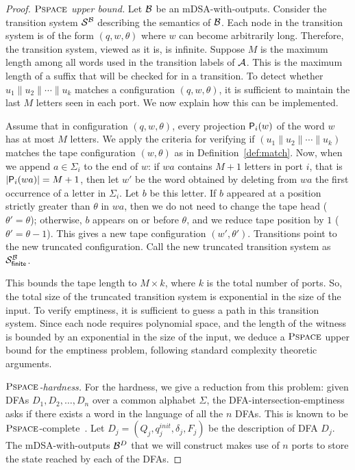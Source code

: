 \begin{proof}
    
    \emph{$\operatorname{\textsc{Pspace}}$ upper bound.} Let $\mathcal{B}$ be an mDSA-with-outputs. Consider the transition system $\mathcal{S}^{\mathcal{B}}$ describing the semantics of $\mathcal{B}$. Each node in the transition system is of the form $(q, w, \theta)$ where $w$ can become arbitrarily long. Therefore, the transition system, viewed as it is, is infinite. Suppose $M$ is the maximum length among all words used in the transition labels of $\mathcal{A}$. This is the maximum length of a suffix that will be checked for in a transition. To detect whether $u_1 \parallel u_2 \parallel \cdots \parallel u_k$ matches a configuration $(q, w, \theta)$, it is sufficient to maintain the last $M$ letters seen in each port. We now explain how this can be implemented.
    
    Assume that in configuration $(q, w, \theta)$, every projection $\mathsf{P}_{i}(w)$ of the word $w$ has at most $M$ letters. We apply the criteria for verifying if $(u_1 \parallel u_2 \parallel \cdots \parallel u_k)$ matches the tape configuration $(w, \theta)$ as in Definition~\ref{def:match}. Now, when we append $a \in \Sigma_i$ to the end of $w$: if $wa$ contains $M+1$ letters in port $i$, that is $|\mathsf{P}_{i}(wa)| = M+1$, then let $w'$ be the word obtained by deleting from $wa$ the first occurrence of a letter in $\Sigma_i$. Let $b$ be this letter. If $b$ appeared at a position strictly greater than $\theta$ in $wa$, then we do not need to change the tape head ($\theta' = \theta$); otherwise, $b$ appears on or before $\theta$, and we reduce tape position by $1$ ($\theta' = \theta - 1$). This gives a new tape configuration $(w', \theta')$. Transitions point to the new truncated configuration. Call the new truncated transition system as $\mathcal{S}_{\mathsf{finite}}^{\mathcal{B}}$.
    
    
    This bounds the tape length to $M \times k$, where $k$ is the total number of ports. So, the total size of the truncated transition system is exponential in the size of the input. To verify emptiness, it is sufficient to guess a path in this transition system. Since each node requires polynomial space, and the length of the witness is bounded by an exponential in the size of the input, we deduce a $\operatorname{\textsc{Pspace}}$ upper bound for the emptiness problem, following standard complexity theoretic arguments. 

    \emph{$\operatorname{\textsc{Pspace}}$-hardness.} For the hardness, we give a reduction from this problem: given DFAs $D_1, D_2, \dots, D_n$ over a common alphabet $\Sigma$, the DFA-intersection-emptiness asks if there exists a word in the language of all the $n$ DFAs. This is known to be $\operatorname{\textsc{Pspace}}$-complete~\cite{10.1109/SFCS.1977.16}. Let $D_j = (Q_j, q^{init}_j, \delta_j, F_j)$ be the description of DFA $D_j$. The mDSA-with-outputs $\mathcal{B}^D$ that we will construct makes use of $n$ ports to store the state reached by each of the DFAs.


\end{proof}
